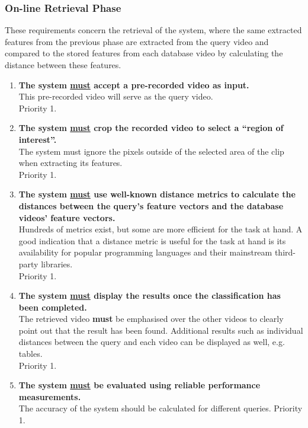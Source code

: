 \subsubsection{On-line Retrieval Phase}

These requirements concern the retrieval of the system, where the same extracted features from the previous phase are extracted from the query video and compared to the stored features from each database video by calculating the distance between these features.

\begin{enumerate}[label=F\arabic*,resume]

    \item \textbf{The system \underline{must} accept a pre-recorded video as input.}\\
    This pre-recorded video will serve as the query video.\\
    Priority 1.
    
    \item \textbf{The system \underline{must} crop the recorded video to select a ``region of interest''.}\\
    The system must ignore the pixels outside of the selected area of the clip when extracting its features.\\
    Priority 1.
    
    \item \textbf{The system \underline{must} use well-known distance metrics to calculate the distances between the query's feature vectors and the database videos' feature vectors.}\\
    Hundreds of metrics exist, but some are more efficient for the task at hand. A good indication that a distance metric is useful for the task at hand is its availability for popular programming languages and their mainstream third-party libraries.\\
    Priority 1.
    
    \item \textbf{The system \underline{must} display the results once the classification has been completed.}\\
    The retrieved video \textbf{must} be emphasised over the other videos to clearly point out that the result has been found. Additional results such as individual distances between the query and each video can be displayed as well, e.g. tables.\\
    Priority 1.
    
    \item \textbf{The system \underline{must} be evaluated using reliable performance measurements.}\\
    The accuracy of the system should be calculated for different queries.
    Priority 1.
    

\end{enumerate}
